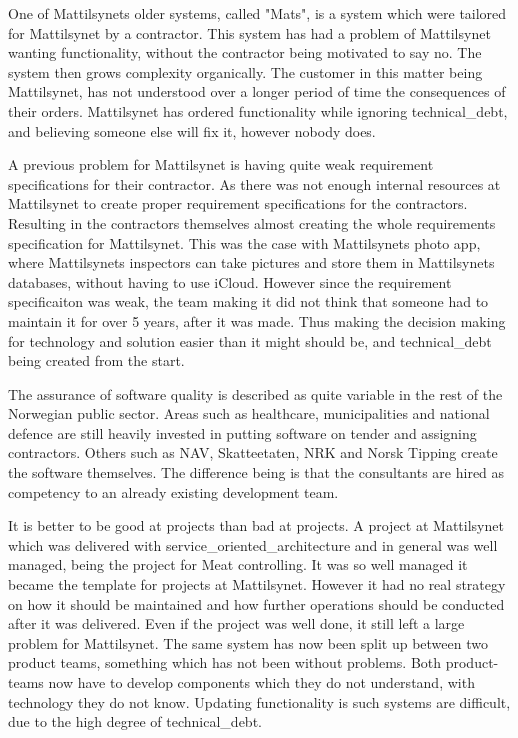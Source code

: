 One of Mattilsynets older systems, called "Mats", is a system which were tailored for Mattilsynet by a contractor. This system has had a problem of Mattilsynet wanting functionality, without the contractor being motivated to say no. The system then grows complexity organically. The customer in this matter being Mattilsynet, has not understood over a longer period of time the consequences of their orders. Mattilsynet has ordered functionality while ignoring \gls{technical_debt}, and believing someone else will fix it, however nobody does.

A previous problem for Mattilsynet is having quite weak requirement specifications for their contractor. As there was not enough internal resources at Mattilsynet to create proper requirement specifications for the contractors. Resulting in the contractors themselves almost creating the whole requirements specification for Mattilsynet. This was the case with Mattilsynets photo app, where Mattilsynets inspectors can take pictures and store them in Mattilsynets databases, without having to use iCloud. However since the requirement specificaiton was weak, the team making it did not think that someone had to maintain it for over 5 years, after it was made. Thus making the decision making for technology and solution easier than it might should be, and \gls{technical_debt} being created from the start.

The assurance of software quality is described as quite variable in the rest of the Norwegian public sector. Areas such as healthcare, municipalities and national defence are still heavily invested in putting software on tender and assigning contractors. Others such as NAV, Skatteetaten, NRK and Norsk Tipping create the software themselves. The difference being is that the consultants are hired as competency to an already existing development team.

It is better to be good at projects than bad at projects. A project at Mattilsynet which was delivered with \gls{service_oriented_architecture} and in general was well managed, being the project for Meat controlling. It was so well managed it became the template for projects at Mattilsynet. However it had no real strategy on how it should be maintained and how further operations should be conducted after it was delivered. Even if the project was well done, it still left a large problem for Mattilsynet. The same system has now been split up between two product teams, something which has not been without problems. Both product-teams now have to develop components which they do not understand, with technology they do not know. Updating functionality is such systems are difficult, due to the high degree of \gls{technical_debt}.

